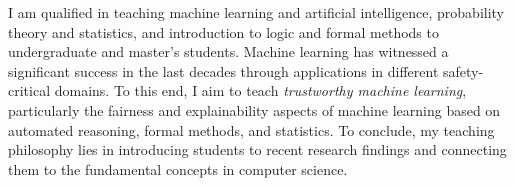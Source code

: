 \documentclass[11pt]{article}
\begin{document}
		I am qualified in teaching machine learning and artificial intelligence, probability theory and statistics, and introduction to logic and formal methods to undergraduate and master's students. Machine learning has witnessed a significant success in the last decades through applications in different safety-critical domains. To this end, I aim to teach \textit{trustworthy machine learning}, particularly the fairness and explainability aspects of machine learning based on automated reasoning, formal methods, and statistics. To conclude, my teaching philosophy lies in introducing students to recent research findings and connecting them to the fundamental concepts in computer science.
		
		
\end{document}

